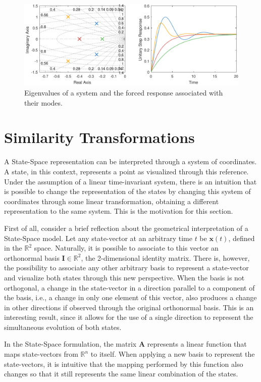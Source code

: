 \documentclass[a4paper,11pt]{book}
\numberwithin{figure}{chapter}
\numberwithin{equation}{chapter}
\numberwithin{table}{chapter}
\theoremstyle{definition}
\begin{document}
\begin{figure}[ht]  \centering
    \includegraphics[width=\textwidth]{chapter2/eigen01}
    
    \caption{Eigenvalues of a system and the forced response associated with their modes.}
    \label{fig:eigen01}
\end{figure}

\section{Similarity Transformations}

A State-Space representation can be interpreted through a system of coordinates. A state, in this context, represents a point as visualized through this reference. Under the assumption of a linear time-invariant system, there is an intuition that is possible to change the representation of the states by changing this system of coordinates through some linear transformation, obtaining a different representation to the same system. This is the motivation for this section.

First of all, consider a brief reflection about the geometrical interpretation of a State-Space model. Let any state-vector at an arbitrary time $t$ be $\bm{x}(t)$, defined in the $\mathbb{R}^{2}$ space. Naturally, it is possible to associate to this vector an orthonormal basis $\bm{I} \in \mathbb{R}^2$, the 2-dimensional identity matrix. There is, however, the possibility to associate any other arbitrary basis to represent a state-vector and visualize both states through this new perspective. When the basis is not orthogonal, a change in the state-vector in a direction parallel to a component of the basis, i.e., a change in only one element of this vector, also produces a change in other directions if observed through the original orthonormal basis. This is an interesting result, since it allows for the use of a single direction to represent the simultaneous evolution of both states.

In the State-Space formulation, the matrix $\bm{A}$ represents a linear function that maps state-vectors from $\mathbb{R}^{n}$ to itself. When applying a new basis to represent the state-vectors, it is intuitive that the mapping performed by this function also changes so that it still represents the same linear combination of the states.
\end{document}
